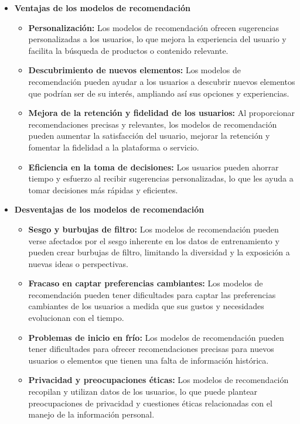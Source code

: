 \begin{itemize}
    \item \textbf{Ventajas de los modelos de recomendación}
    \begin{itemize}
        \item \textbf{Personalización:} Los modelos de recomendación ofrecen sugerencias personalizadas a los usuarios, lo que mejora la experiencia del usuario y facilita la búsqueda de productos o contenido relevante.
        \item \textbf{Descubrimiento de nuevos elementos:} Los modelos de recomendación pueden ayudar a los usuarios a descubrir nuevos elementos que podrían ser de su interés, ampliando así sus opciones y experiencias.
        \item \textbf{Mejora de la retención y fidelidad de los usuarios:} Al proporcionar recomendaciones precisas y relevantes, los modelos de recomendación pueden aumentar la satisfacción del usuario, mejorar la retención y fomentar la fidelidad a la plataforma o servicio.
        \item \textbf{Eficiencia en la toma de decisiones:} Los usuarios pueden ahorrar tiempo y esfuerzo al recibir sugerencias personalizadas, lo que les ayuda a tomar decisiones más rápidas y eficientes.
    \end{itemize}
    \item \textbf{Desventajas de los modelos de recomendación}
    \begin{itemize}
        \item \textbf{Sesgo y burbujas de filtro:} Los modelos de recomendación pueden verse afectados por el sesgo inherente en los datos de entrenamiento y pueden crear burbujas de filtro, limitando la diversidad y la exposición a nuevas ideas o perspectivas.
        \item \textbf{Fracaso en captar preferencias cambiantes:} Los modelos de recomendación pueden tener dificultades para captar las preferencias cambiantes de los usuarios a medida que sus gustos y necesidades evolucionan con el tiempo.
        \item \textbf{Problemas de inicio en frío:} Los modelos de recomendación pueden tener dificultades para ofrecer recomendaciones precisas para nuevos usuarios o elementos que tienen una falta de información histórica.
        \item \textbf{Privacidad y preocupaciones éticas:} Los modelos de recomendación recopilan y utilizan datos de los usuarios, lo que puede plantear preocupaciones de privacidad y cuestiones éticas relacionadas con el manejo de la información personal.
    \end{itemize}
\end{itemize}
